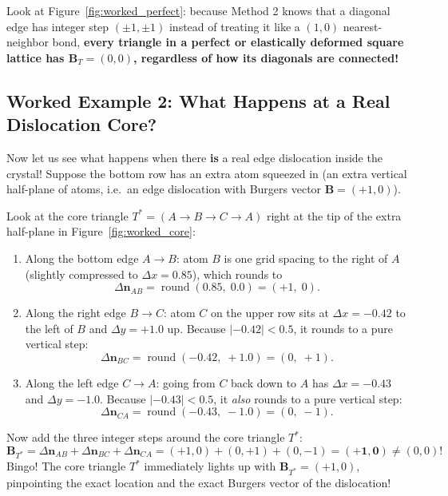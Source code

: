 \documentclass[11pt,a4paper]{article}
\begin{document}
Look at Figure~\ref{fig:worked_perfect}: because Method 2 knows that a diagonal edge has integer step
$(\pm 1, \pm 1)$ instead of treating it like a $(1,0)$ nearest-neighbor bond, \textbf{every triangle
in a perfect or elastically deformed square lattice has $\bm{B}_T = (0,0)$, regardless of how its
diagonals are connected!}

\subsection{Worked Example 2: What Happens at a Real Dislocation Core?}

Now let us see what happens when there \textbf{is} a real edge dislocation inside the crystal!
Suppose the bottom row has an extra atom squeezed in (an extra vertical half-plane of atoms, i.e.\
an edge dislocation with Burgers vector $\bm{B} = (+1, 0)$).

Look at the core triangle $T^* = (A \to B \to C \to A)$ right at the tip of the extra half-plane in
Figure~\ref{fig:worked_core}:
\begin{enumerate}
  \item Along the bottom edge $A \to B$: atom $B$ is one grid spacing to the right of $A$ (slightly compressed to $\Delta x = 0.85$), which rounds to
        \[
          \Delta\bm{n}_{AB} = \operatorname{round}(0.85,\; 0.0) = (+1,\; 0).
        \]
  \item Along the right edge $B \to C$: atom $C$ on the upper row sits at $\Delta x = -0.42$ to the left of $B$ and $\Delta y = +1.0$ up. Because $|-0.42| < 0.5$, it rounds to a pure vertical step:
        \[
          \Delta\bm{n}_{BC} = \operatorname{round}(-0.42,\; +1.0) = (0,\; +1).
        \]
  \item Along the left edge $C \to A$: going from $C$ back down to $A$ has $\Delta x = -0.43$ and $\Delta y = -1.0$. Because $|-0.43| < 0.5$, it \emph{also} rounds to a pure vertical step:
        \[
          \Delta\bm{n}_{CA} = \operatorname{round}(-0.43,\; -1.0) = (0,\; -1).
        \]
\end{enumerate}
Now add the three integer steps around the core triangle $T^*$:
\begin{equation}
  \bm{B}_{T^*} = \Delta\bm{n}_{AB} + \Delta\bm{n}_{BC} + \Delta\bm{n}_{CA}
  = (+1, 0) + (0, +1) + (0, -1) = \bm{(+1, 0)} \neq (0,0)!
\end{equation}
Bingo! The core triangle $T^*$ immediately lights up with $\bm{B}_{T^*} = (+1, 0)$, pinpointing the
exact location and the exact Burgers vector of the dislocation!
\end{document}
